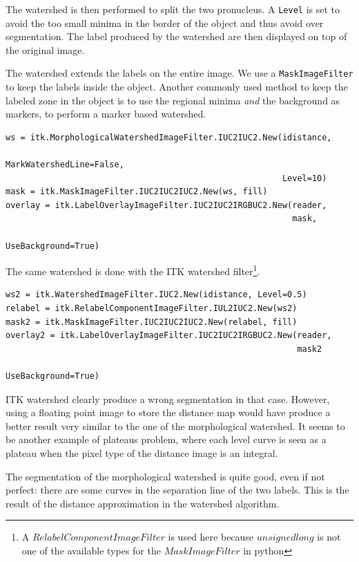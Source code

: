 \documentclass{InsightArticle}
\begin{document}
The watershed is then performed to split the two pronucleus. A \verb$Level$
is set to avoid the too small minima in the border of the object and thus
avoid over segmentation. The label produced by the watershed are then
displayed on top of the original image.

The watershed extends the labels on the entire image. We use a
\verb$MaskImageFilter$ to keep the labels inside the object. Another commonly
used method to keep the labeled zone in the object is to use the regional
minima {\em and} the background as markers, to perform a marker based watershed.

\small \begin{verbatim}
ws = itk.MorphologicalWatershedImageFilter.IUC2IUC2.New(idistance,
                                                        MarkWatershedLine=False,
                                                        Level=10)
mask = itk.MaskImageFilter.IUC2IUC2IUC2.New(ws, fill)
overlay = itk.LabelOverlayImageFilter.IUC2IUC2IRGBUC2.New(reader,
                                                          mask,
                                                          UseBackground=True)
\end{verbatim} \normalsize

The same watershed is done with the ITK watershed filter\footnote{A
$RelabelComponentImageFilter$ is used here because $unsigned long$ is
not one of the available types for the $MaskImageFilter$ in python}.

\small \begin{verbatim}
ws2 = itk.WatershedImageFilter.IUC2.New(idistance, Level=0.5)
relabel = itk.RelabelComponentImageFilter.IUL2IUC2.New(ws2)
mask2 = itk.MaskImageFilter.IUC2IUC2IUC2.New(relabel, fill)
overlay2 = itk.LabelOverlayImageFilter.IUC2IUC2IRGBUC2.New(reader,
                                                           mask2
                                                           UseBackground=True)
\end{verbatim} \normalsize

ITK watershed clearly produce a wrong segmentation in that case. However, using
a floating point image to store the distance map would have produce a better
result very similar to the one of the morphological watershed. It seems to be
another example of plateaus problem, where each level curve is seen as a plateau
when the pixel type of the distance image is an integral.

The segmentation of the morphological watershed is quite good, even if not perfect:
there are some curves in the separation line of the two labels. This is the
result of the distance approximation in the watershed algorithm.
\end{document}

